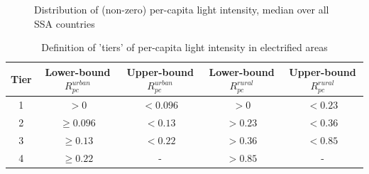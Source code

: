 \documentclass[preprint,12pt]{elsarticle}
\begin{document}
\begin{figure}[!htb]
    \centering
    \qquad
    \caption{Distribution of (non-zero) per-capita light intensity, median over all SSA countries}
    \label{distribution}
\end{figure}


\begin{table}[H]
\centering
\caption{Definition of 'tiers' of per-capita light intensity in electrified areas}
\small
\label{tiers}
\begin{tabular}{@{}c|cc|cc@{}}
\hline\hline
Tier & Lower-bound $R_{pc}^{urban}$ & Upper-bound $R_{pc}^{urban}$ & Lower-bound $R_{pc}^{rural}$ & Upper-bound $R_{pc}^{rural}$ \\ \hline
1  & $>0$ & $<0.096$ & $>0$ & $<0.23$  \\
2  & $\geq0.096$ & $<0.13$ &$ >0.23$ & $<0.36$\\
3  & $\geq0.13$ & $<0.22$  &$>0.36$ & $<0.85$\\
4  & $\geq0.22$ & - & $>0.85$ & - \\ 
\hline
\end{tabular}
\end{table}
\end{document}
